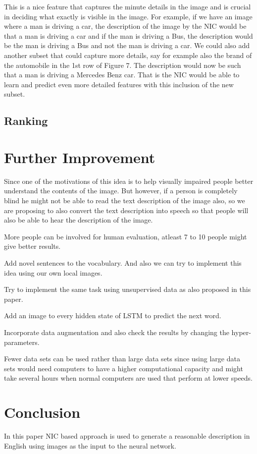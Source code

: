 \documentclass[a4paper,UKenglish,cleveref, autoref, thm-restate]{lipics-v2021}
\begin{document}
This is a nice feature that captures the minute details in the image and is crucial in deciding what exactly is visible in the image. For example, if we have an image where a man is driving a car, the description of the image by the NIC would be that a man is driving a car and if the man is driving a Bus, the description would be the man is driving a Bus and not the man is driving a car.
We could also add another subset that could capture more details, say for example also the brand of the automobile in the 1st row of Figure 7. The description would now be such that a man is driving a Mercedes Benz car. That is the NIC would be able to learn and predict even more detailed features with this inclusion of the new subset.

\subsection{Ranking}
\label{results}


\section{Further Improvement}
\label{further improvement}
Since one of the motivations of this idea is to help visually impaired people better understand the contents of the image. But however, if a person is completely blind he might not be able to read the text description of the image also, so we are proposing to also convert the text description into speech so that people will also be able to hear the description of the image.

More people can be involved for human evaluation, atleast 7 to 10 people might give better results.

Add novel sentences to the vocabulary. And also we can try to implement this idea using our own local images.

Try to implement the same task using unsupervised data as also proposed in this paper.

Add an image to every hidden state of LSTM to predict the next word.

Incorporate data augmentation and also check the results by changing the hyper-parameters.

Fewer data sets can be used rather than large data sets since using large data sets would need computers to have a higher computational capacity and might take several hours when normal computers are used that perform at lower speeds.


\section{Conclusion}
\label{conclusion}
In this paper NIC based approach is used to generate a reasonable description in English using images as the input to the neural network.
\end{document}
